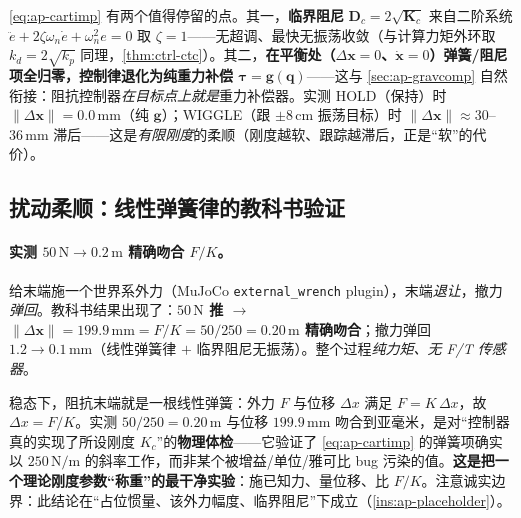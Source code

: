 \begin{insight}[临界阻尼 $\mathbf{D}=2\sqrt{\mathbf{K}}$：平衡处弹簧项归零 $=$ 纯重力补偿]\label{ins:ap-critdamp}
\cref{eq:ap-cartimp} 有两个值得停留的点。其一，\textbf{临界阻尼} $\mathbf{D}_c=2\sqrt{\mathbf{K}_c}$ 来自二阶系统 $\ddot e+2\zeta\omega_n\dot e+\omega_n^2 e=0$ 取 $\zeta=1$——无超调、最快无振荡收敛（与计算力矩外环取 $k_d=2\sqrt{k_p}$ 同理，\cref{thm:ctrl-ctc}）。其二，\textbf{在平衡处（$\Delta\mathbf{x}=0$、$\dot{\mathbf{x}}=0$）弹簧/阻尼项全归零，控制律退化为纯重力补偿 $\boldsymbol{\tau}=\mathbf{g}(\mathbf{q})$}——这与 \cref{sec:ap-gravcomp} 自然衔接：阻抗控制器\emph{在目标点上就是}重力补偿器。实测 HOLD（保持）时 $\|\Delta\mathbf{x}\|=0.0\,\mathrm{mm}$（纯 $\mathbf{g}$）；WIGGLE（跟 $\pm 8\,\mathrm{cm}$ 振荡目标）时 $\|\Delta\mathbf{x}\|\approx 30$--$36\,\mathrm{mm}$ 滞后——这是\emph{有限刚度}的柔顺（刚度越软、跟踪越滞后，正是“软”的代价）。
\end{insight}

\subsection{扰动柔顺：线性弹簧律的教科书验证}
\label{sec:ap-disturb}

\paragraph{实测 $50\,\mathrm{N}\to0.2\,\mathrm{m}$ 精确吻合 $F/K$。}
给末端施一个世界系外力（MuJoCo \texttt{external\_wrench} plugin），末端\emph{退让}，撤力\emph{弹回}。教科书结果出现了：\textbf{$50\,\mathrm{N}$ 推 $\to$ $\|\Delta\mathbf{x}\|=199.9\,\mathrm{mm}=F/K=50/250=0.20\,\mathrm{m}$ 精确吻合}；撤力弹回 $1.2\to0.1\,\mathrm{mm}$（线性弹簧律 $+$ 临界阻尼无振荡）。整个过程\emph{纯力矩、无 F/T 传感器}。

\begin{insight}[$\Delta x=F/K$ 是阻抗刚度的物理体检]\label{ins:ap-FK}
稳态下，阻抗末端就是一根线性弹簧：外力 $F$ 与位移 $\Delta x$ 满足 $F=K\,\Delta x$，故 $\Delta x=F/K$。实测 $50/250=0.20\,\mathrm{m}$ 与位移 $199.9\,\mathrm{mm}$ 吻合到亚毫米，是对“控制器真的实现了所设刚度 $K_c$”的\textbf{物理体检}——它验证了 \cref{eq:ap-cartimp} 的弹簧项确实以 $250\,\mathrm{N/m}$ 的斜率工作，而非某个被增益/单位/雅可比 bug 污染的值。\textbf{这是把一个理论刚度参数“称重”的最干净实验}：施已知力、量位移、比 $F/K$。注意诚实边界：此结论在“占位惯量、该外力幅度、临界阻尼”下成立（\cref{ins:ap-placeholder}）。
\end{insight}

